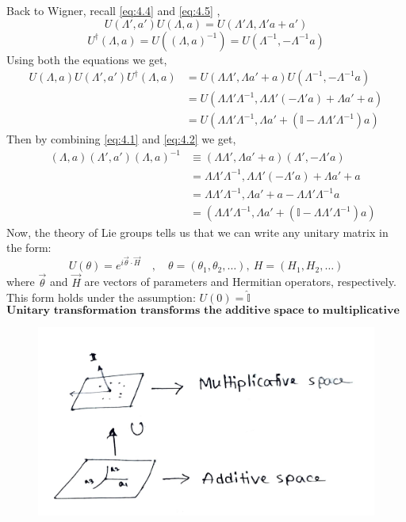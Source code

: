 \documentclass[14pt]{article} %
\begin{document}
\noindent
Back to Wigner, recall \eqref{eq:4.4} and \eqref{eq:4.5} ,
\[
U(\Lambda', a')U(\Lambda, a) = U(\Lambda'\Lambda,\Lambda' a + a') \tag{4.4}
\]
\[
U^\dagger(\Lambda,a)=U\left((\Lambda,a)^{-1}\right)=U(\Lambda^{-1},-\Lambda^{-1}a)  \tag{4.5}
\]
Using both the equations we get,
\begin{align*}
U(\Lambda, a) U(\Lambda', a') U^\dagger(\Lambda, a)
&= U(\Lambda \Lambda', \Lambda a' + a) U(\Lambda^{-1}, -\Lambda^{-1} a) \\
&= U(\Lambda \Lambda' \Lambda^{-1}, \Lambda \Lambda' (-\Lambda' a) + \Lambda a' + a) \\
&= U(\Lambda \Lambda' \Lambda^{-1}, \Lambda a' + (\mathbb{I} - \Lambda \Lambda' \Lambda^{-1}) a) \tag{4.6} \label{4.6}
\end{align*}
Then by combining \eqref{eq:4.1} and \eqref{eq:4.2} we get,
\begin{align*}
\quad~(\Lambda, a) (\Lambda', a') (\Lambda, a)^{-1} 
&\equiv (\Lambda \Lambda', \Lambda a' + a) (\Lambda', -\Lambda' a) \\
&= \Lambda \Lambda' \Lambda^{-1}, \Lambda \Lambda' (-\Lambda' a) + \Lambda a' + a \\
&= \Lambda \Lambda' \Lambda^{-1}, \Lambda a' +a - \Lambda \Lambda' \Lambda^{-1} a \\
&= \left( \Lambda \Lambda' \Lambda^{-1}, \Lambda a' + (\mathbb{I} - \Lambda \Lambda' \Lambda^{-1}) a \right) \tag{4.7} \label{4.7}
\end{align*}
Now, the theory of Lie groups tells us that we can write any unitary matrix in the form:
\[
U(\theta) = e^{ i \vec{\theta}\cdot \vec{H} } \quad, \quad \theta=(\theta_1, \theta_2, \dots),\ H=(H_1, H_2, \dots)
\]
where $\vec{\theta}$ and $\vec{H}$ are vectors of parameters and Hermitian operators, respectively.  
This form holds under the assumption: $U(0) = \hat{\mathbb{I}}$
$$ \boxed{\textbf{Unitary transformation transforms the additive space to multiplicative space.}} $$
\begin{figure}[H]
\centering
\includegraphics[width=0.7\linewidth]{L1_2.jpg}
\caption*{}
\end{figure}
\end{document}
